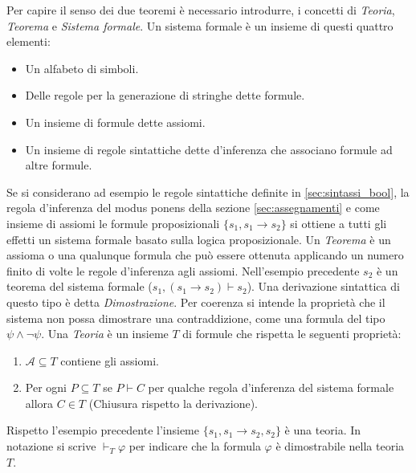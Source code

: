 \documentclass[./main.tex]{subfiles}
\begin{document}
Per capire il senso dei due teoremi è necessario introdurre, i concetti di \textit{Teoria}, \textit{Teorema} e \textit{Sistema formale}.
Un sistema formale è un insieme di questi quattro elementi:

\begin{itemize}
  \item Un alfabeto di simboli.
  \item Delle regole per la generazione di stringhe dette formule.
  \item Un insieme di formule dette assiomi.
  \item Un insieme di regole sintattiche dette d'inferenza che associano formule ad altre formule.
\end{itemize}

Se si considerano ad esempio le regole sintattiche definite in \ref{sec:sintassi_bool},
la regola d'inferenza del modus ponens della sezione \ref{sec:assegnamenti}
e come insieme di assiomi le formule proposizionali $\{s_1, s_1 \rightarrow s_2\}$
si ottiene a tutti gli effetti un sistema formale basato sulla logica proposizionale.
Un \textit{Teorema} è un assioma o una qualunque formula che può essere ottenuta applicando un numero finito di volte le regole d'inferenza agli assiomi.
Nell'esempio precedente $s_2$ è un teorema del sistema formale ($s_1, (s_1 \rightarrow s_2) \vdash s_2$).
Una derivazione sintattica di questo tipo è detta \textit{Dimostrazione}.
Per coerenza si intende la proprietà che il sistema non possa dimostrare una contraddizione,
come una formula del tipo $\psi \land \lnot \psi$.
Una \textit{Teoria} è un insieme $T$ di formule che rispetta le seguenti proprietà:

\begin{enumerate}
  \item $\mathcal{A} \subseteq T$ contiene gli assiomi.
  \item Per ogni $P \subseteq T$ se $P \vdash C$ per qualche regola d'inferenza del sistema formale allora $C \in T$ (Chiusura rispetto la derivazione). 
\end{enumerate}

Rispetto l'esempio precedente l'insieme $\{s_1, s_1 \rightarrow s_2, s_2\}$ è una teoria.
In notazione si scrive $\vdash_T \varphi$ per indicare che la formula $\varphi$ è dimostrabile nella teoria $T$.
\end{document}
